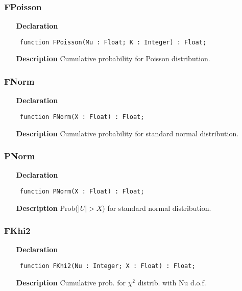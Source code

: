 \documentclass[12pt,a4paper,oneside]{report}
\newcommand{\declarationitem}[1]{\textbf{#1}}
\newcommand{\descriptiontitle}[1]{\textbf{#1}}
\newcommand{\code}[1]{\texttt{#1}}
\begin{document}
\subsubsection{FPoisson}
\label{uigmdist-FPoisson}
\begin{itemize}\item[\declarationitem{Declaration}\hfill]
	\begin{flushleft}
		\code{
			function FPoisson(Mu : Float; K : Integer) : Float;}
	\end{flushleft}
	\item[\descriptiontitle{Description}]
	Cumulative probability for Poisson distribution.
\end{itemize}
\subsubsection{FNorm}
\label{uigmdist-FNorm}
\begin{itemize}\item[\declarationitem{Declaration}\hfill]
	\begin{flushleft}
		\code{
			function FNorm(X : Float) : Float;}
	\end{flushleft}
	\item[\descriptiontitle{Description}]
	Cumulative probability for standard normal distribution.
\end{itemize}
\subsubsection{PNorm}
\label{uigmdist-PNorm}
\begin{itemize}\item[\declarationitem{Declaration}\hfill]
	\begin{flushleft}
		\code{
			function PNorm(X : Float) : Float;}
	\end{flushleft}
	\item[\descriptiontitle{Description}]
	Prob($|U| > X$) for standard normal distribution.
\end{itemize}
\subsubsection{FKhi2}
\label{uigmdist-FKhi2}
\begin{itemize}\item[\declarationitem{Declaration}\hfill]
	\begin{flushleft}
		\code{
			function FKhi2(Nu : Integer; X : Float) : Float;}
	\end{flushleft}
	\item[\descriptiontitle{Description}]
	Cumulative prob. for $\chi^2$ distrib. with Nu d.o.f.
\end{itemize}
\end{document}
